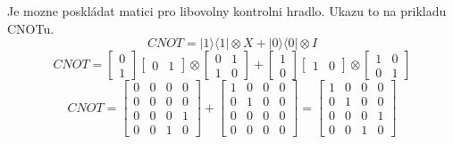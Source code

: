 \documentclass[11pt]{article}
\begin{document}
\par Je mozne poskládat matici pro libovolny kontrolni hradlo. Ukazu to na prikladu CNOTu.
$$CNOT = |1 \rangle\langle 1| \otimes X + |0 \rangle\langle 0| \otimes I$$
$$CNOT = \begin{bmatrix}
        0 \\
        1
    \end{bmatrix}\begin{bmatrix}
        0 & 1
    \end{bmatrix} \otimes \begin{bmatrix}
        0 & 1 \\
        1 & 0
    \end{bmatrix} + \begin{bmatrix}
        1 \\
        0
    \end{bmatrix}\begin{bmatrix}
        1 & 0
    \end{bmatrix} \otimes \begin{bmatrix}
        1 & 0 \\
        0 & 1
    \end{bmatrix}$$
$$CNOT = \begin{bmatrix}
        0 & 0 & 0 & 0 \\
        0 & 0 & 0 & 0 \\
        0 & 0 & 0 & 1 \\
        0 & 0 & 1 & 0
    \end{bmatrix} + \begin{bmatrix}
        1 & 0 & 0 & 0 \\
        0 & 1 & 0 & 0 \\
        0 & 0 & 0 & 0 \\
        0 & 0 & 0 & 0
    \end{bmatrix} = \begin{bmatrix}
        1 & 0 & 0 & 0 \\
        0 & 1 & 0 & 0 \\
        0 & 0 & 0 & 1 \\
        0 & 0 & 1 & 0
    \end{bmatrix}$$
\end{document}
